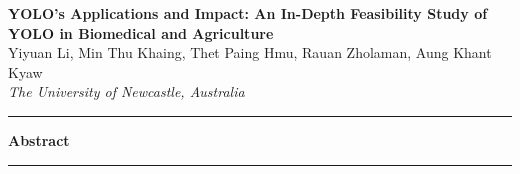 \documentclass[a4paper,12pt]{article}
\renewenvironment{abstract}
 {\begin{center}
    \Large\bfseries Abstract
    \end{center}
    \begin{center}
    \begin{minipage}{0.8\textwidth}
    \small}
 {\end{minipage}
  \end{center}
  \medskip}
\begin{document}
\pagestyle{fancy}
\thispagestyle{empty}
\fancyhead[L]{}
\renewcommand*{\thefootnote}{\fnsymbol{footnote}}
\begin{center}
\Large{\textbf{YOLO's Applications and Impact: An In-Depth Feasibility Study of YOLO in Biomedical and Agriculture}}
\vspace{0.4cm}
\normalsize
\\ Yiyuan Li, Min Thu Khaing, Thet Paing Hmu, Rauan Zholaman, Aung Khant Kyaw \\
\vspace{0.1cm}
\textit{The University of Newcastle, Australia}
\medskip
\normalsize
\end{center}
{\color{gray}\hrule}
\vspace{0.4cm}
\begin{abstract}

\end{abstract}
{\color{gray}\hrule}
\medskip









\end{document}
